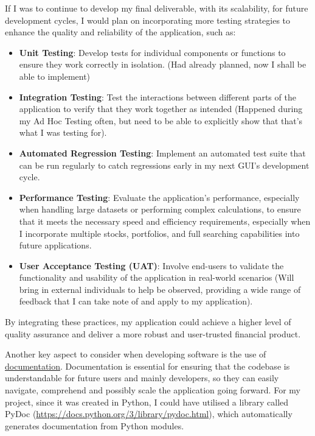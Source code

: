 \documentclass{article}
\begin{document}
\newpage
If I was to continue to develop my final deliverable, with its scalability, for future development cycles, I would plan on incorporating more testing strategies to enhance the quality and reliability of the application, such as:

\begin{itemize}
    \item \textbf{Unit Testing}: Develop tests for individual components or functions to ensure they work correctly in isolation. (Had already planned, now I shall be able to implement)
    \item \textbf{Integration Testing}: Test the interactions between different parts of the application to verify that they work together as intended (Happened during my Ad Hoc Testing often, but need to be able to explicitly show that that's what I was testing for).
    \item \textbf{Automated Regression Testing}: Implement an automated test suite that can be run regularly to catch regressions early in my next GUI's development cycle.
    \item \textbf{Performance Testing}: Evaluate the application's performance, especially when handling large datasets or performing complex calculations, to ensure that it meets the necessary speed and efficiency requirements, especially when I incorporate multiple stocks, portfolios, and full searching capabilities into future applications.
    \item \textbf{User Acceptance Testing (UAT)}: Involve end-users to validate the functionality and usability of the application in real-world scenarios (Will bring in external individuals to help be observed, providing a wide range of feedback that I can take note of and apply to my application).
\end{itemize}

By integrating these practices, my application could achieve a higher level of quality assurance and deliver a more robust and user-trusted financial product.\\\vspace{0.3cm}

Another key aspect to consider when developing software is the use of \underline{documentation}. Documentation is essential for ensuring that the codebase is understandable for future users and mainly developers, so they can easily navigate, comprehend and possibly scale the application going forward. For my project, since it was created in Python, I could have utilised a library called PyDoc (\url{https://docs.python.org/3/library/pydoc.html}), which automatically generates documentation from Python modules.\\\vspace{0.3cm}
\end{document}
